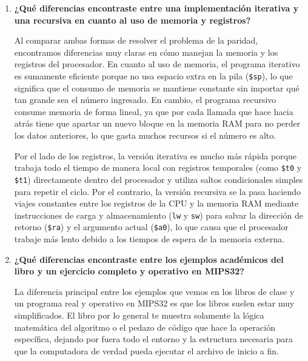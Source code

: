 \documentclass[12pt,letterpaper]{article}
\begin{document}
\begin{enumerate}
    \item \textbf{\large\color{UCBlue}¿Qué diferencias encontraste entre una implementación iterativa y una recursiva en cuanto al uso de memoria y registros?}
    
    \vspace{0.2cm}
    Al comparar ambas formas de resolver el problema de la paridad, encontramos diferencias muy claras en cómo manejan la memoria y los registros del procesador. En cuanto al uso de memoria, el programa iterativo es sumamente eficiente porque no usa espacio extra en la pila (\texttt{\$sp}), lo que significa que el consumo de memoria se mantiene constante sin importar qué tan grande sea el número ingresado. En cambio, el programa recursivo consume memoria de forma lineal, ya que por cada llamada que hace hacia atrás tiene que apartar un nuevo bloque en la memoria RAM para no perder los datos anteriores, lo que gasta muchos recursos si el número es alto.

    Por el lado de los registros, la versión iterativa es mucho más rápida porque trabaja todo el tiempo de manera local con registros temporales (como \texttt{\$t0} y \texttt{\$t1}) directamente dentro del procesador y utiliza saltos condicionales simples para repetir el ciclo. Por el contrario, la versión recursiva se la pasa haciendo viajes constantes entre los registros de la CPU y la memoria RAM mediante instrucciones de carga y almacenamiento (\texttt{lw} y \texttt{sw}) para salvar la dirección de retorno (\texttt{\$ra}) y el argumento actual (\texttt{\$a0}), lo que causa que el procesador trabaje más lento debido a los tiempos de espera de la memoria externa.
    

     \newpage
     \item \textbf{\large\color{UCBlue}¿Qué diferencias encontraste entre los ejemplos académicos del libro y un ejercicio completo y operativo en MIPS32?}
    
    \vspace{0.2cm}
    La diferencia principal entre los ejemplos que vemos en los libros de clase y un programa real y operativo en MIPS32 es que los libros suelen estar muy simplificados. El libro por lo general te muestra solamente la lógica matemática del algoritmo o el pedazo de código que hace la operación específica, dejando por fuera todo el entorno y la estructura necesaria para que la computadora de verdad pueda ejecutar el archivo de inicio a fin.


\end{enumerate}
\end{document}
